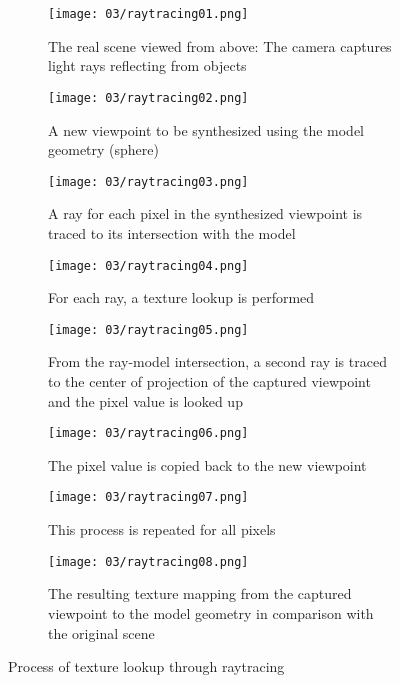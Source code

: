 \begin{figure}
\centering
    \hfill
    \begin{subfigure}[t]{0.3\textwidth}            
            \centering
            \texttt{[image: 03/raytracing01.png]}
            \caption{The real scene viewed from above: The camera captures light rays reflecting from objects}
    \end{subfigure}%
    \hfill
    \begin{subfigure}[t]{0.3\textwidth}
            \centering
            \texttt{[image: 03/raytracing02.png]}
            \caption{A new viewpoint to be synthesized using the model geometry (sphere)}
    \end{subfigure}
    \hfill
    \hfill

    \hfill
    \begin{subfigure}[t]{0.3\textwidth}            
            \centering
            \texttt{[image: 03/raytracing03.png]}
            \caption{A ray for each pixel in the synthesized viewpoint is traced to its intersection with the model}
    \end{subfigure}%
    \hfill
    \begin{subfigure}[t]{0.3\textwidth}
            \centering
            \texttt{[image: 03/raytracing04.png]}
            \caption{For each ray, a texture lookup is performed}
    \end{subfigure}
    \hfill
    \begin{subfigure}[t]{0.3\textwidth}
            \centering
            \texttt{[image: 03/raytracing05.png]}
            \caption{From the ray-model intersection, a second ray is traced to the center of projection of the captured viewpoint and the pixel value is looked up}
    \end{subfigure}
    \hfill

    \hfill
    \begin{subfigure}[t]{0.3\textwidth}            
            \centering
            \texttt{[image: 03/raytracing06.png]}
            \caption{The pixel value is copied back to the new viewpoint}
    \end{subfigure}%
    \hfill
    \begin{subfigure}[t]{0.3\textwidth}
            \centering
            \texttt{[image: 03/raytracing07.png]}
            \caption{This process is repeated for all pixels}
    \end{subfigure}
    \hfill
    \begin{subfigure}[t]{0.3\textwidth}
            \centering
            \texttt{[image: 03/raytracing08.png]}
            \caption{The resulting texture mapping from the captured viewpoint to the model geometry in comparison with the original scene}
    \end{subfigure}
    \hfill
    \caption[Process of texture lookup through raytracing]{Process of texture lookup through raytracing}\label{fig:raytracing}
\end{figure}


